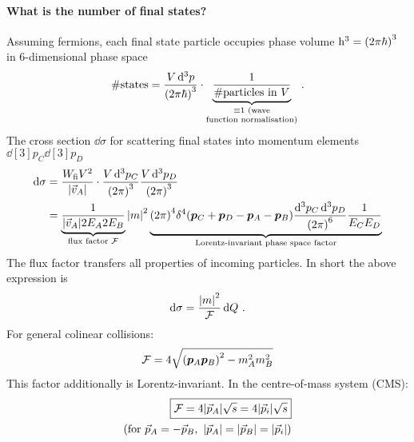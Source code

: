 \paragraph{What is the number of final states?}
Assuming fermions, each final state particle occupies phase volume $\mathrm{h}^3 = \qty(2\pi \hbar)^3$ in 6-dimensional phase space
\begin{align}
    \# \text{states} = \frac{V \dd[3]{p}}{\qty(2\pi \hbar)^3} \cdot \underbrace{\frac{1}{\# \text{particles in } V}}_{\substack{\equiv 1 \text{ (wave} \\ \text{function normalisation)}}}\,.
\end{align}
The cross section $\dd{\sigma}$ for scattering final states into momentum elements $\dd[3]{p_C} \dd[3]{p_D}$
\begin{align}
    \dd{\sigma} & = \frac{W_{\mathrm{fi}} V^2}{\qty|\vec v_A|} \cdot \frac{V \dd[3]{p_C}}{\qty(2\pi)^3}\frac{V \dd[3]{p_D}}{\qty(2\pi)^3} \nonumber \\
    & = \underbrace{\frac{1}{\qty|\vec v_A| 2 E_A 2 E_B}}_{\text{flux factor } \mathcal{F}} \qty|m|^2 \underbrace{\qty(2\pi)^4 \delta^4 \qty({\bm{p}}_C + {\bm{p}}_D - {\bm{p}}_A - {\bm{p}}_B) \frac{\dd[3]{p_C} \dd[3]{p_D}}{\qty(2\pi)^6} \frac{1}{E_C E_D}}_\text{Lorentz-invariant phase space factor}
\end{align}
The flux factor transfers all properties of incoming particles. In short the above expression is
\begin{align}
    \dd{\sigma} = \frac{\qty|m|^2}{\mathcal{F}} \dd{Q}\,.
\end{align}
For general colinear collisions:
\begin{align}
    \mathcal{F} = 4 \sqrt{\qty({\bm{p}}_A {\bm{p}}_B)^2 - m_A^2 m_B^2}
\end{align}
This factor additionally is Lorentz-invariant. In the centre-of-mass system (CMS):
\begin{align}
    \boxed{\mathcal{F} = 4 \qty| \vec p_A| \sqrt s = 4 \qty|\vec p_i| \sqrt s}\\
    (\text{for } \vec p_A = - \vec p_B, \ \qty|\vec p_A| = \qty|\vec p_B| = \qty|\vec p_i|)\nonumber 
\end{align}
